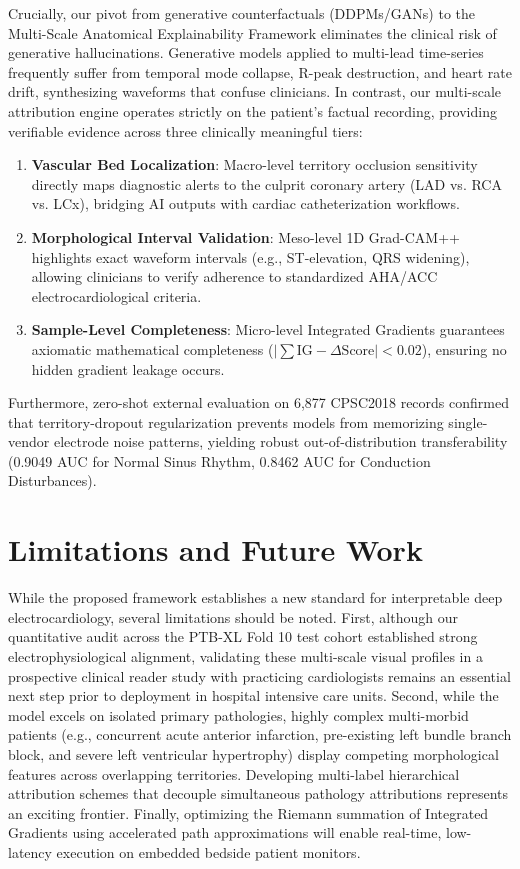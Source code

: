\documentclass[12pt]{elsarticle}
\begin{document}
Crucially, our pivot from generative counterfactuals (DDPMs/GANs) to the Multi-Scale Anatomical Explainability Framework eliminates the clinical risk of generative hallucinations. Generative models applied to multi-lead time-series frequently suffer from temporal mode collapse, R-peak destruction, and heart rate drift, synthesizing waveforms that confuse clinicians. In contrast, our multi-scale attribution engine operates strictly on the patient's factual recording, providing verifiable evidence across three clinically meaningful tiers:
\begin{enumerate}
    \item \textbf{Vascular Bed Localization}: Macro-level territory occlusion sensitivity directly maps diagnostic alerts to the culprit coronary artery (LAD vs. RCA vs. LCx), bridging AI outputs with cardiac catheterization workflows.
    \item \textbf{Morphological Interval Validation}: Meso-level 1D Grad-CAM++ highlights exact waveform intervals (e.g., ST-elevation, QRS widening), allowing clinicians to verify adherence to standardized AHA/ACC electrocardiological criteria.
    \item \textbf{Sample-Level Completeness}: Micro-level Integrated Gradients guarantees axiomatic mathematical completeness ($|\sum \text{IG} - \Delta \text{Score}| < 0.02$), ensuring no hidden gradient leakage occurs.
\end{enumerate}

Furthermore, zero-shot external evaluation on 6,877 CPSC2018 records confirmed that territory-dropout regularization prevents models from memorizing single-vendor electrode noise patterns, yielding robust out-of-distribution transferability (0.9049 AUC for Normal Sinus Rhythm, 0.8462 AUC for Conduction Disturbances).

\section{Limitations and Future Work}
\label{sec:limitations}
While the proposed framework establishes a new standard for interpretable deep electrocardiology, several limitations should be noted. First, although our quantitative audit across the PTB-XL Fold 10 test cohort established strong electrophysiological alignment, validating these multi-scale visual profiles in a prospective clinical reader study with practicing cardiologists remains an essential next step prior to deployment in hospital intensive care units. Second, while the model excels on isolated primary pathologies, highly complex multi-morbid patients (e.g., concurrent acute anterior infarction, pre-existing left bundle branch block, and severe left ventricular hypertrophy) display competing morphological features across overlapping territories. Developing multi-label hierarchical attribution schemes that decouple simultaneous pathology attributions represents an exciting frontier. Finally, optimizing the Riemann summation of Integrated Gradients using accelerated path approximations will enable real-time, low-latency execution on embedded bedside patient monitors.
\end{document}
